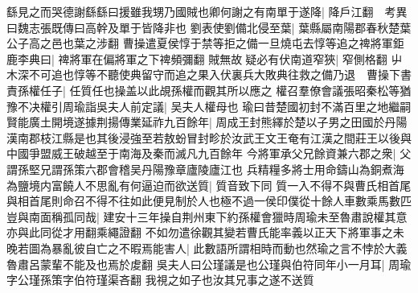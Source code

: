 繇見之而哭德謝繇繇曰援雖我甥乃國賊也卿何謝之有南單于遂降|{
	降戶江翻　考異曰魏志張既傳曰高幹及單于皆降非也}
劉表使劉備北侵至葉|{
	葉縣屬南陽郡春秋楚葉公子高之邑也葉之涉翻}
曹操遣夏侯惇于禁等拒之備一旦燒屯去惇等追之禆將軍鉅鹿李典曰|{
	禆將軍在偏將軍之下禆頻彌翻}
賊無故疑必有伏南道窄狹|{
	窄側格翻}
屮木深不可追也惇等不聽使典留守而追之果入伏裏兵大敗典往救之備乃退　曹操下書責孫權任子|{
	任質任也操盖以此覘孫權而觀其所以應之}
權召羣僚會議張昭秦松等猶豫不决權引周瑜詣吳夫人前定議|{
	吴夫人權母也}
瑜曰昔楚國初封不滿百里之地繼嗣賢能廣土開境遂據荆揚傳業延祚九百餘年|{
	周成王封熊繹於楚以子男之田國於丹陽漢南郡枝江縣是也其後浸強至若敖蚡冒封畛於汝武王文王奄有江漢之間莊王以後與中國爭盟威王破越至于南海及秦而滅凡九百餘年}
今將軍承父兄餘資兼六郡之衆|{
	父謂孫堅兄謂孫策六郡會稽吴丹陽豫章廬陵廬江也}
兵精糧多將士用命鑄山為銅煮海為鹽境内富饒人不思亂有何逼迫而欲送質|{
	質音致下同}
質一入不得不與曹氏相首尾與相首尾則命召不得不往如此便見制於人也極不過一侯印僕從十餘人車數乘馬數匹豈與南面稱孤同哉|{
	建安十三年操自荆州東下約孫權會獵時周瑜未至魯肅說權其意亦與此同從才用翻乘繩證翻}
不如勿遣徐觀其變若曹氏能率義以正天下將軍事之未晚若圖為暴亂彼自亡之不暇焉能害人|{
	此數語所謂相時而動也然瑜之言不悖於大義魯肅呂蒙輩不能及也焉於䖍翻}
吳夫人曰公瑾議是也公瑾與伯符同年小一月耳|{
	周瑜字公瑾孫策字伯符瑾渠吝翻}
我視之如子也汝其兄事之遂不送質

